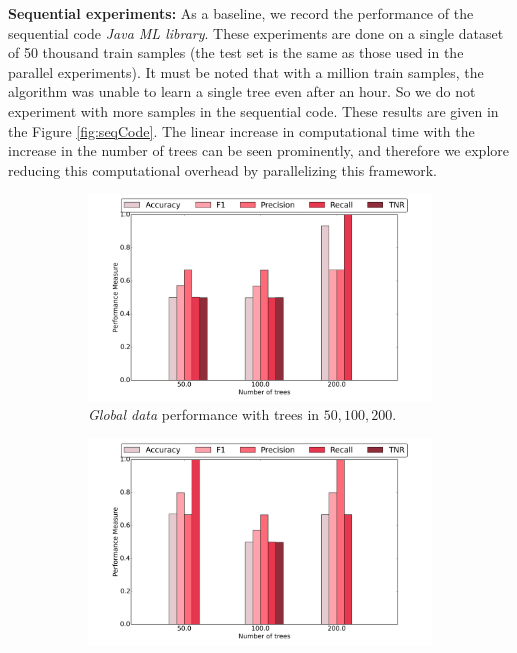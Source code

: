 \documentclass{sig-alternate-05-2015}
\begin{document}
\textbf{Sequential experiments:} As a baseline, we record the performance of the sequential code \textit{Java ML library}. These experiments are done on a single dataset of 50 thousand train samples (the test set is the same as those used in the parallel experiments). It must be noted that with a million train samples, the algorithm was unable to learn a single tree even after an hour. So we do not experiment with more samples in the sequential code. These results are given in the Figure \ref{fig:seqCode}. The linear increase in computational time with the increase in the number of trees can be seen prominently, and therefore we explore reducing this computational overhead by parallelizing this framework. 

\begin{figure}[t]
\centering
\begin{subfigure}{.4\textwidth}
\centering
\includegraphics[scale=0.2]{figures/8Map-globalPerf.png}
\caption{\textit{Global data} performance with trees in ${50,100,200}$.}
\end{subfigure}
\begin{subfigure}{.4\textwidth}
\centering
\includegraphics[scale=0.2]{figures/8Map-localLabelPerf.png}

\end{subfigure}
\end{figure}
\end{document}
